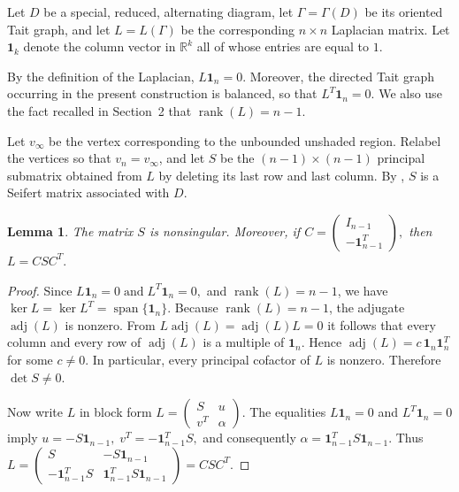 \documentclass[a4paper,12pt]{amsart}
\numberwithin{equation}{section}
\theoremstyle{plain}
\newtheorem{lemma}[theorem]{Lemma}
\theoremstyle{definition}
\begin{document}
Let $D$ be a special, reduced, alternating diagram, let
$\Gamma=\Gamma(D)$ be its oriented Tait graph, and let
$L=L(\Gamma)$ be the corresponding $n\times n$ Laplacian matrix.
Let $\mathbf{1}_k$ denote the column vector in $\mathbb{R}^k$ all of
whose entries are equal to $1$.

By the definition of the Laplacian,
$
L\mathbf{1}_n=0.
$
Moreover, the directed Tait graph occurring in the present
construction is balanced, so that
$
L^T\mathbf{1}_n=0.
$
We also use the fact recalled in Section~2 that
$
\operatorname{rank}(L)=n-1.
$

Let $v_{\infty}$ be the vertex corresponding to the unbounded
unshaded region. Relabel the vertices so that $v_n=v_{\infty}$, and
let $S$ be the $(n-1)\times(n-1)$ principal submatrix obtained from
$L$ by deleting its last row and last column. By
\cite[Theorem~1.1(i)]{SilWil19}, $S$ is a Seifert matrix associated
with $D$.

\begin{lemma}
	\label{lem:factorization}
	The matrix $S$ is nonsingular. Moreover, if
	$
	C=
	\begin{pmatrix}
		I_{n-1}\\
		-\mathbf{1}_{n-1}^T
	\end{pmatrix},
	$
	then
	$
	L=CSC^T.
	$
\end{lemma}

\begin{proof}
	Since
	$
	L\mathbf{1}_n=0
	\;\text{and}\;
	L^T\mathbf{1}_n=0,
	$
	and $\operatorname{rank}(L)=n-1$, we have
	$
	\ker L=\ker L^T=\operatorname{span}\{\mathbf{1}_n\}.
	$
	Because $\operatorname{rank}(L)=n-1$, the adjugate
	$\operatorname{adj}(L)$ is nonzero. From
	$
	L\operatorname{adj}(L)
	=
	\operatorname{adj}(L)L
	=
	0
	$
	it follows that every column and every row of
	$\operatorname{adj}(L)$ is a multiple of $\mathbf{1}_n$. Hence
	$
	\operatorname{adj}(L)=c\,\mathbf{1}_n\mathbf{1}_n^T
	$
	for some $c\neq0$. In particular, every principal cofactor of $L$
	is nonzero. Therefore
	$
	\det S\neq0.
	$
	
	Now write $L$ in block form
	$
	L=
	\begin{pmatrix}
		S & u\\
		v^T & \alpha
	\end{pmatrix}.
	$
	The equalities $L\mathbf{1}_n=0$ and
	$L^T\mathbf{1}_n=0$ imply
	$
	u=-S\mathbf{1}_{n-1},
	\;
	v^T=-\mathbf{1}_{n-1}^T S,
	$
	and consequently
	$
	\alpha=\mathbf{1}_{n-1}^T
	S\mathbf{1}_{n-1}.
	$
	Thus
	$
	L=
	\begin{pmatrix}
		S & -S\mathbf{1}_{n-1}\\
		-\mathbf{1}_{n-1}^TS &
		\mathbf{1}_{n-1}^TS\mathbf{1}_{n-1}
	\end{pmatrix}
	=
	CSC^T.
	$
\end{proof}
\end{document}

